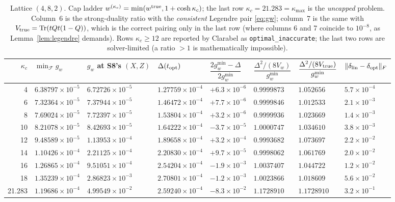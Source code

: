 \documentclass[11pt]{article}
\newcommand{\e}[1]{\times10^{#1}}
\begin{document}
\begin{table}[h]\centering\small
\begin{tabular}{rlllllll}
\toprule
$\kappa_c$&$\min_{\mathcal F}g_w$&$g_w$ at S8's $(X,Z)$&$\Delta(t_{\rm opt})$&
$\dfrac{2g_w^{\min}-\Delta}{2g_w^{\min}}$&$\dfrac{\Delta^2/(8V_w)}{g_w^{\min}}$&
$\dfrac{\Delta^2/(8V_{\rm true})}{g_w^{\min}}$&$\|\delta_{\rm lin}-\delta_{\rm opt}\|_F$\\
\midrule
 4    &$6.38797\e{-5}$&$6.72726\e{-5}$&$1.27759\e{-4}$&$+6.3\e{-6}$&$0.9999873$&$1.052656$&$5.7\e{-4}$\\
 6    &$7.32364\e{-5}$&$7.37944\e{-5}$&$1.46472\e{-4}$&$+7.7\e{-6}$&$0.9999846$&$1.012533$&$2.1\e{-3}$\\
 8    &$7.69024\e{-5}$&$7.72397\e{-5}$&$1.53804\e{-4}$&$+3.2\e{-6}$&$0.9999936$&$1.023669$&$1.4\e{-3}$\\
10    &$8.21078\e{-5}$&$8.42693\e{-5}$&$1.64222\e{-4}$&$-3.7\e{-5}$&$1.0000747$&$1.034610$&$3.8\e{-3}$\\
12    &$9.48589\e{-5}$&$1.13953\e{-4}$&$1.89658\e{-4}$&$+3.2\e{-4}$&$0.9993682$&$1.073697$&$2.2\e{-2}$\\
14    &$1.10426\e{-4}$&$2.21125\e{-4}$&$2.20830\e{-4}$&$+9.7\e{-5}$&$0.9998062$&$1.061769$&$2.0\e{-2}$\\
16    &$1.26865\e{-4}$&$9.51051\e{-4}$&$2.54204\e{-4}$&$-1.9\e{-3}$&$1.0037407$&$1.044722$&$1.2\e{-2}$\\
18    &$1.35239\e{-4}$&$2.86823\e{-3}$&$2.70801\e{-4}$&$-1.2\e{-3}$&$1.0023866$&$1.018609$&$5.6\e{-2}$\\
21.283&$1.19686\e{-4}$&$4.99549\e{-2}$&$2.59240\e{-4}$&$-8.3\e{-2}$&$1.1728910$&$1.1728910$&$3.2\e{-1}$\\
\bottomrule
\end{tabular}
\caption{Lattice $(4,8,2)$.  Cap ladder $w^{(\kappa_c)}=\min(w^{\rm true},1+\cosh\kappa_c)$; the last
row $\kappa_c=21.283=\kappa_{\max}$ is the \emph{uncapped} problem.  Column~6 is the strong-duality
ratio with the \emph{consistent} Legendre pair \eqref{eq:gw}; column~7 is the same with
$V_{\rm true}=\operatorname{Tr}(tQt(1-Q))$, which is the correct pairing only in the last row (where columns 6
and 7 coincide to $10^{-8}$, as Lemma~\ref{lem:legendre} demands).  Rows $\kappa_c\ge12$ are
reported by Clarabel as \texttt{optimal\_inaccurate}; the last two rows are solver-limited
(a ratio $>1$ is mathematically impossible).}
\label{tab:lattice}
\end{table}
\end{document}
